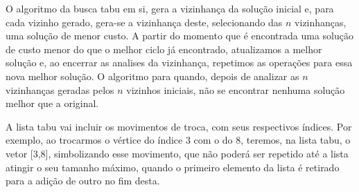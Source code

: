 O algoritmo da busca tabu em si, gera a vizinhança da solução inicial e, para cada vizinho gerado, gera-se a vizinhança deste, selecionando das $n$ vizinhanças, uma solução de menor custo. A partir do momento que é encontrada uma solução de custo menor do que o melhor ciclo já encontrado, atualizamos a melhor solução e, ao encerrar as analises da vizinhança, repetimos as operações para essa nova melhor solução. O algoritmo para quando, depois de analizar as $n$ vizinhanças geradas pelos $n$ vizinhos iniciais, não se encontrar nenhuma solução melhor que a original.

A lista tabu vai incluir os movimentos de troca, com seus respectivos índices. Por exemplo, ao trocarmos o vértice do índice 3 com o do 8, teremos, na lista tabu, o vetor [3,8], simbolizando esse movimento, que não poderá ser repetido até a lista atingir o seu tamanho máximo, quando o primeiro elemento da lista é retirado para a adição de outro no fim desta.